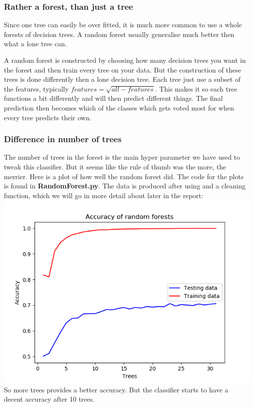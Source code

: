 \documentclass[parskip=half]{scrartcl}
\theoremstyle{definition}
\theoremstyle{remark}
\newcommand{\funcname}[1]{{\color{blue}{\texttt{#1}}}}
\begin{document}
\subsubsection{Rather a forest, than just a tree}

Since one tree can easily be over fitted, it is much more common to use a whole forests of decision trees. A random forest usually generalise much better then what a lone tree can.

A random forest is constructed by choosing how many decision trees you want in the forest and then train every tree on your data. But the construction of these trees is done differently then a lone decision tree.
Each tree just use a subset of the features, typically $ features = \sqrt{all-features}$. This makes it so each tree functions a bit differently and will then predict different things.
The final prediction then becomes which of the classes which gets voted most for when every tree predicts their own.

\subsubsection{Difference in number of trees}
The number of trees in the forest is the main hyper parameter we have used to tweak this classifier. But it seems like the rule of thumb was the more, the merrier.
Here is a plot of how well the random forest did. The code for the plots is found in \textbf{RandomForest.py}. The data is produced after using \funcname{CountVectorizer} and a cleaning function, which we will go in more detail about later in the report:\\
\includegraphics[scale=.7]{images/32treesAcc}\\
So more trees provides a better accuracy. But the classifier starts to have a decent accuracy after 10 trees.
\end{document}
